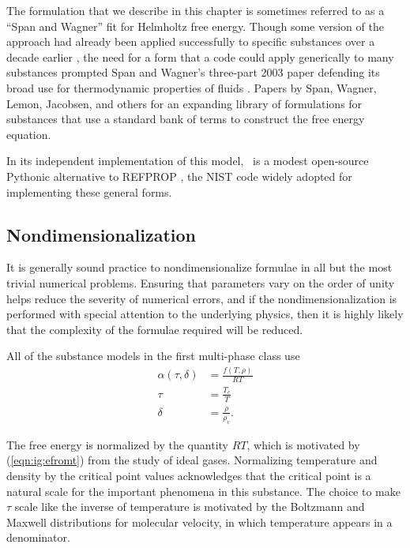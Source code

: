The formulation that we describe in this chapter is sometimes referred to as a ``Span and Wagner'' fit for Helmholtz free energy.  Though some version of the approach had already been applied successfully to specific substances over a decade earlier \cite{stewart:1991, setzmann:1991}, the need for a form that a code could apply generically to many substances prompted Span and Wagner's three-part 2003 paper defending its broad use for thermodynamic properties of fluids \cite{span:2003:1, span:2003:2, span:2003:3}.  Papers by Span, Wagner, Lemon, Jacobsen, and others for an expanding library of formulations for substances that use a standard bank of terms to construct the free energy equation.

In its independent implementation of this model, \PM\ is a modest open-source Pythonic alternative to REFPROP \cite{refprop}, the NIST code widely adopted for implementing these general forms.

\subsection{Nondimensionalization}

It is generally sound practice to nondimensionalize formulae in all but the most trivial numerical problems.  Ensuring that parameters vary on the order of unity helps reduce the severity of numerical errors, and if the nondimensionalization is performed with special attention to the underlying physics, then it is highly likely that the complexity of the formulae required will be reduced.

All of the substance models in the first multi-phase class use
\begin{subequations}
\begin{align}
\alpha(\tau,\delta) &= \frac{f(T,\rho)}{R T}\\
\tau &= \frac{T_c}{T}\\
\delta &= \frac{\rho}{\rho_c}.
\end{align}
\end{subequations}

The free energy is normalized by the quantity $R T$, which is motivated by (\ref{eqn:ig:efromt}) from the study of ideal gases.  Normalizing temperature and density by the critical point values acknowledges that the critical point is a natural scale for the important phenomena in this substance.  The choice to make $\tau$ scale like the inverse of temperature is motivated by the Boltzmann and Maxwell distributions for molecular velocity, in which temperature appears in a denominator.

